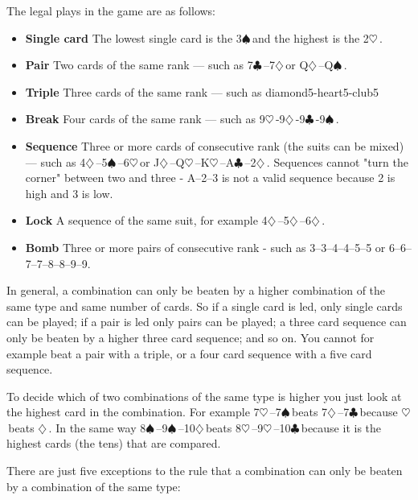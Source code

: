 \documentclass[12pt]{article}
\newcommand{\heart}{$\heartsuit$\,}
\renewcommand{\diamond}{$\diamondsuit$\,}
\newcommand{\spade}{$\spadesuit$\,}
\newcommand{\club}{$\clubsuit$\,}
\begin{document}
The legal plays in the game are as follows:

\begin{itemize}
\item \textbf{Single card}
    The lowest single card is the 3\spade and the highest is the 2\heart. 
\item \textbf{Pair}
    Two cards of the same rank --- such as 7\club--7\diamond or Q\diamond--Q\spade. 
\item \textbf{Triple}
    Three cards of the same rank --- such as diamond5-heart5-club5 
\item \textbf{Break}
    Four cards of the same rank --- such as 9\heart-9\diamond-9\club-9\spade. 
\item \textbf{Sequence}
    Three or more cards of consecutive rank (the suits can be mixed) --- such as 4\diamond--5\spade--6\heart or J\diamond--Q\heart--K\heart--A\club--2\diamond. Sequences cannot "turn the corner" between two and three - A--2--3 is not a valid sequence because 2 is high and 3 is low. 
   
\item \textbf{Lock}
 A sequence of the same suit, for example 4\diamond--5\diamond--6\diamond. 
 
\item \textbf{Bomb}
    Three or more pairs of consecutive rank - such as 3--3--4--4--5--5 or 6--6--7--7--8--8--9--9. 
\end{itemize}

In general, a combination can only be beaten by a higher combination of the same type and same number of cards. So if a single card is led, only single cards can be played; if a pair is led only pairs can be played; a three card sequence can only be beaten by a higher three card sequence; and so on. You cannot for example beat a pair with a triple, or a four card sequence with a five card sequence.

To decide which of two combinations of the same type is higher you just look at the highest card in the combination. For example 7\heart--7\spade beats 7\diamond--7\club because \heart beats \diamond. In the same way 8\spade--9\spade--10\diamond beats 8\heart--9\heart--10\club because it is the highest cards (the tens) that are compared.

There are just five exceptions to the rule that a combination can only be beaten by a combination of the same type:
\end{document}
